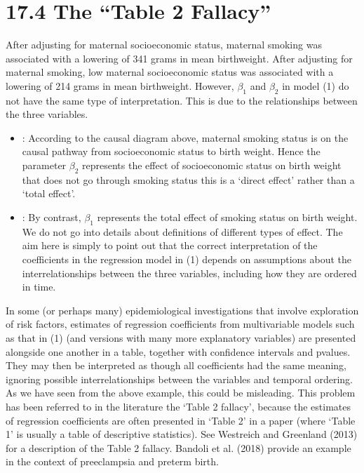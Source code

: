 \documentclass[letterpaper,10pt,english]{jupyterBook}
\begin{document}
\section{17.4 The “Table 2 Fallacy”}
\label{\detokenize{17. Investigations round up:the-table-2-fallacy}}
\sphinxAtStartPar
After adjusting for maternal socioeconomic status, maternal smoking was associated with a lowering of 341 grams in mean birthweight. After adjusting for maternal smoking, low maternal socioeconomic status was associated with a lowering of 214 grams in mean birthweight. However, \(\beta_{1}\) and \(\beta_{2}\) in model (1) do not have the same type of interpretation. This  is due to the relationships between the three variables.
\begin{itemize}
\item {} 
\sphinxAtStartPar
{}: According to the causal diagram above, maternal smoking status is on the causal pathway from socioeconomic status to birth weight. Hence the parameter \(\beta_2\) represents the effect of socioeconomic status on birth weight that does not go through smoking status \sphinxhyphen{} this is a ‘direct effect’ rather than a ‘total effect’. 

\item {} 
\sphinxAtStartPar
{}: By contrast, \(\beta_{1}\) represents the total effect of smoking status on birth weight. We do not go into details about definitions of different types of effect. The aim here is simply to point out that the correct interpretation of the coefficients in the regression model in (1) depends on assumptions about the inter\sphinxhyphen{}relationships between the three variables, including how they are ordered in time.

\end{itemize}

\sphinxAtStartPar
In some (or perhaps many) epidemiological investigations that involve exploration of risk factors, estimates of regression coefficients from multivariable models such as that in (1) (and versions with many more explanatory variables) are presented alongside one another in a table, together with confidence intervals and p\sphinxhyphen{}values. They may then be interpreted as though all coefficients had the same meaning, ignoring possible inter\sphinxhyphen{}relationships between the variables and temporal ordering. As we have seen from the above example, this could be misleading. This problem has been referred to in the literature the ‘Table 2 fallacy’, because the estimates of regression coefficients are often presented in ‘Table 2’ in a paper (where ‘Table 1’ is usually a table of descriptive statistics). See Westreich and Greenland (2013) for a description of the Table 2 fallacy. Bandoli et al. (2018) provide an example in the context of preeclampsia and preterm birth.
\end{document}
